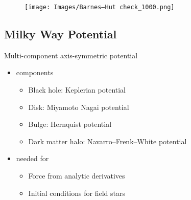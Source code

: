 \documentclass{beamer}
\begin{document}
\begin{frame}
\begin{figure}
\centering
\texttt{[image: Images/Barnes–Hut check\_1000.png]}
\end{figure}
\end{frame}


\subsection{Milky Way Potential}

\begin{frame}

Multi-component axis-symmetric potential

\begin{itemize}
\item components
\begin{itemize}
\item Black hole: Keplerian potential
\item Disk: Miyamoto Nagai potential
\item Bulge: Hernquist potential
\item Dark matter halo: Navarro–Frenk–White potential
\end{itemize}
\item needed for

\begin{itemize}
\item Force from analytic derivatives
\item Initial conditions for field stars
\end{itemize}
\end{itemize}


\end{frame}
\end{document}
